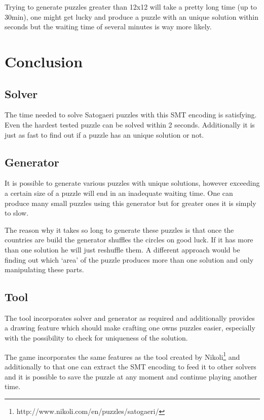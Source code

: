 Trying to generate puzzles greater than 12x12 will take a pretty long time (up to 30min), one might get lucky and produce a puzzle with an unique solution within seconds but the waiting time of several minutes is way more likely.

\chapter{Conclusion} \label{Conclusion}
\section{Solver}
The time needed to solve Satogaeri puzzles with this SMT encoding is satisfying. Even the hardest tested puzzle can be solved within 2 seconds. Additionally it is just as fast to find out if a puzzle has an unique solution or not.

\section{Generator}
It is possible to generate various puzzles with unique solutions, however exceeding a certain size of a puzzle will end in an inadequate waiting time. One can produce many small puzzles using this generator but for greater ones it is simply to slow.

The reason why it takes so long to generate these puzzles is that once the countries are build the generator shuffles the circles on good luck. If it has more than one solution he will just reshuffle them. A different approach would be finding out which `area' of the puzzle produces more than one solution and only manipulating these parts.

\section{Tool}
The tool incorporates solver and generator as required and additionally provides a drawing feature which should make crafting one owns puzzles easier, especially with the possibility to check for uniqueness of the solution.

The game incorporates the same features as the tool created by Nikoli\footnote{http://www.nikoli.com/en/puzzles/satogaeri/} and additionally to that one can extract the SMT encoding to feed it to other solvers and it is possible to save the puzzle at any moment and continue playing another time.

